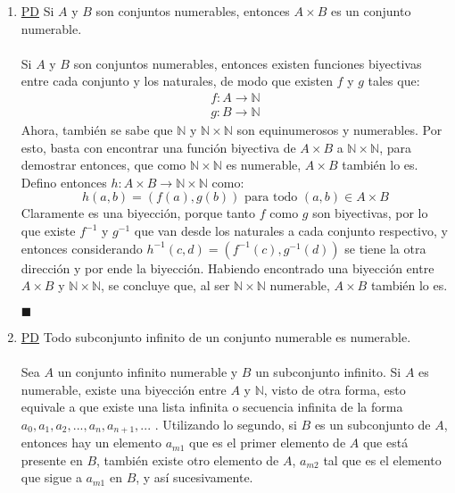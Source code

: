 \documentclass[letter]{article}
\begin{document}
	\begin{pregunta}{1} %
		\begin{enumerate}
		\item \underline{PD} Si $A$ y $B$ son conjuntos numerables, entonces $A \times B$ es un conjunto numerable.\\ \\
		Si $A$ y $B$ son conjuntos numerables, entonces existen funciones biyectivas entre cada conjunto y los naturales, de modo que existen $f$ y $g$ tales que:
		\begin{align*}
			f: A \rightarrow \mathbb{N}\\
			g: B \rightarrow \mathbb{N}
		\end{align*}
		Ahora, también se sabe que $\mathbb{N}$ y $\mathbb{N} \times \mathbb{N}$ son equinumerosos y numerables. Por esto, basta con encontrar una función biyectiva de $A \times B$ a $\mathbb{N} \times \mathbb{N}$, para demostrar entonces, que como $\mathbb{N} \times \mathbb{N}$ es numerable, $A \times B$ también lo es. Defino entonces $h: A \times B \rightarrow \mathbb{N} \times \mathbb{N}$ como:
		$$h(a,b) = (f(a), g(b)) \text{  para todo } (a,b) \in A \times B$$
		Claramente es una biyección, porque tanto $f$ como $g$ son biyectivas, por lo que existe $f^{-1}$ y $g^{-1}$ que van desde los naturales a cada conjunto respectivo, y entonces considerando $h^{-1}(c,d)=(f^{-1}(c), g^{-1}(d))$ se tiene la otra dirección y por ende la biyección. Habiendo encontrado una biyección entre $A \times B$ y $\mathbb{N} \times \mathbb{N}$, se concluye que, al ser $\mathbb{N} \times \mathbb{N}$ numerable, $A \times B$ también lo es.
		\begin{flushright}$\blacksquare$\end{flushright}
		\item \underline{PD} Todo subconjunto infinito de un conjunto numerable es numerable.\\\\
		Sea $A$ un conjunto infinito numerable y $B$ un subconjunto infinito. Si $A$ es numerable, existe una biyección entre $A$ y $\mathbb{N}$, visto de otra forma, esto equivale a que existe una lista infinita o secuencia infinita de la forma $a_0,a_1,a_2,...,a_n, a_{n+1},...$ . Utilizando lo segundo, si $B$ es un subconjunto de $A$, entonces hay un elemento $a_{m1}$ que es el primer elemento de $A$ que está presente en $B$, también existe otro elemento de $A$, $a_{m2}$ tal que es el elemento que sigue a $a_{m1}$ en $B$, y así sucesivamente.\\

\end{enumerate}
\end{pregunta}
\end{document}
